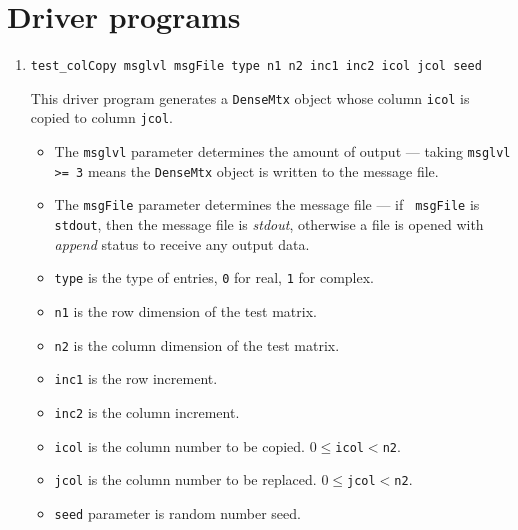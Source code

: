 \par
\section{Driver programs}
\label{section:Iter:drivers}
\par
\begin{enumerate}
 
\item
\begin{verbatim}
test_colCopy msglvl msgFile type n1 n2 inc1 inc2 icol jcol seed 
\end{verbatim}
This driver program generates a {\tt  DenseMtx} object
whose column {\tt icol} is copied to column {\tt jcol}.
\par
\begin{itemize}
\item
The {\tt msglvl} parameter determines the amount of output ---
taking {\tt msglvl >= 3} means the {\tt DenseMtx} object is written
to the message file.
\item
The {\tt msgFile} parameter determines the message file --- if {\tt
msgFile} is {\tt stdout}, then the message file is {\it stdout},
otherwise a file is opened with {\it append} status to receive any
output data.
\item
{\tt type} is the type of entries, {\tt 0} for real, {\tt 1} for complex.
\item
{\tt n1} is the row dimension of the test matrix.
\item
{\tt n2} is the column dimension of the test matrix.
\item
{\tt inc1} is the row increment.
\item
{\tt inc2} is the column increment.
\item
{\tt icol} is the column number to be copied.  $0\leq${\tt icol}$<${\tt n2}.
\item
{\tt jcol} is the column number to be replaced.  $0\leq${\tt jcol}$<${\tt n2}.
\item
{\tt seed} parameter is random number seed.
\end{itemize}


\end{enumerate}

